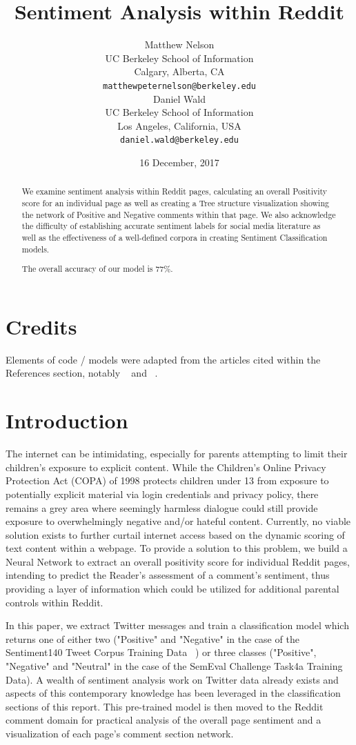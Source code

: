 \documentclass[11pt]{article}
\title{Sentiment Analysis within Reddit}
\author{  Matthew Nelson \\
  UC Berkeley School of Information \\
  Calgary, Alberta, CA \\
  {\tt matthewpeternelson@berkeley.edu} \\\And
  Daniel Wald \\
  UC Berkeley School of Information \\
  Los Angeles, California, USA \\
  {\tt daniel.wald@berkeley.edu} \\
  }
\date{16 December, 2017}
\begin{document}
\maketitle
\begin{abstract}
  We examine sentiment analysis within Reddit pages, calculating an overall Positivity score for an individual page as well as creating a Tree structure visualization showing the network of Positive and Negative comments within that page. We also acknowledge the difficulty of establishing accurate sentiment labels for social media literature as well as the effectiveness of a well-defined corpora in creating Sentiment Classification models. 
  
The overall accuracy of our model is \(77\%\).
  
\end{abstract}

\section{Credits}

Elements of code / models were adapted from the articles cited 
within the References section, notably ~\cite{agarwol:11} 
and ~\cite{maas:2011}. 

\section{Introduction}

The internet can be intimidating, especially for parents attempting 
to limit their children's exposure to explicit content. While the 
Children's Online Privacy Protection Act (COPA) of 1998 protects 
children under 13 from exposure to potentially explicit material 
via login credentials and privacy policy, there remains a grey area where seemingly harmless dialogue could still provide exposure to overwhelmingly negative and/or hateful content. Currently, no viable solution exists to further curtail internet access based on the dynamic scoring of text content within a webpage. To provide a solution to this problem, we build a Neural Network to extract 
an overall positivity score for individual Reddit pages, intending to predict the 
Reader's assessment of a comment's sentiment, thus providing 
a layer of information which could be utilized for additional parental controls within Reddit.

In this paper, we extract Twitter messages and train a classification model which returns one of either two
("Positive" and "Negative" in the case of the Sentiment140 Tweet Corpus Training 
Data ~\cite{agarwol:11}) or three classes ("Positive", "Negative" and "Neutral" in 
the case of the SemEval Challenge Task4a Training Data). A wealth of sentiment 
analysis work on Twitter data already exists and aspects of this contemporary 
knowledge has been leveraged in the classification sections of this report. This pre-trained model is then moved to the Reddit comment domain for practical analysis of the overall page sentiment and a visualization of each page's comment section network.
\end{document}
